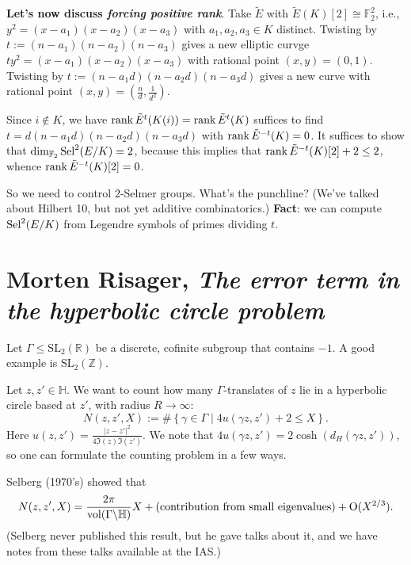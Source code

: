 \documentclass[reqno]{amsart} 
\begin{document}
\textbf{Let's now discuss \emph{forcing positive rank}}.  Take $\tilde{E}$ with $\tilde{E}(K)[2] \cong \mathbb{F}_2^2$, i.e., $y^2 =(x - a_1)(x - a_2)(x - a_3)$ with $a_1, a_2, a_3 \in K$ distinct.  Twisting by $t :=(n - a_1)(n - a_2)(n - a_3)$ gives a new elliptic curvge $t y^2 =(x - a_1)(x - a_2)(x - a_3)$ with rational point $(x, y) =(0, 1)$.  Twisting by $t :=(n - a_1 d)(n - a_2 d)(n - a_3 d)$ gives a new curve with rational point $(x, y) =(\tfrac{n}{d}, \tfrac{1}{d^2})$.

Since $i \notin K$, we have $\operatorname{rank} \tilde{E}^t(K(i)) = \operatorname{rank} \tilde{E}^t(K)$ suffices to find $t = d(n - a_1 d)(n - a_2 d)(n - a_3 d)$ with $\operatorname{rank} \tilde{E}^{- t}(K) = 0$.  It suffices to show that $\dim_{\mathbb{F}_2} \operatorname{Sel}^2(E/K) = 2$, because this implies that $\operatorname{rank} \tilde{E}^{- t}(K)[2] + 2 \leq 2$, whence $\operatorname{rank} \tilde{E}^{- t}(K)[2] = 0$.

So we need to control $2$-Selmer groups.  What's the punchline?  (We've talked about Hilbert 10, but not yet additive combinatorics.)  \textbf{Fact}: we can compute $\operatorname{Sel}^2(E / K)$ from Legendre symbols of primes dividing $t$.

\section{Morten Risager, \emph{The error term in the hyperbolic circle problem}}

Let $\Gamma \leq \mathrm{SL}_2(\mathbb{R})$ be a discrete, cofinite subgroup that contains $- 1$.  A good example is $\mathrm{SL}_2(\mathbb{Z})$.

Let $z, z ' \in \mathbb{H}$.  We want to count how many $\Gamma$-translates of $z$ lie in a hyperbolic circle based at $z'$, with radius $R \rightarrow \infty$:
\begin{equation*}
  N(z, z', X)
  :=
  \#
  \left\{
    \gamma \in \Gamma \mid
    4 u(\gamma z, z ') + 2 \leq X
  \right\}.
\end{equation*}
Here $u(z, z') = \frac{\lvert z - z ' \rvert^2}{4 \Im(z) \Im(z')}$.
We note that  $4 u(\gamma z, z ') = 2 \cosh(d_H(\gamma z, z '))$, so one can formulate the counting problem in a few ways.

Selberg (1970's) showed that
\begin{equation*}
  N(z, z', X)
  =
  \frac{2 \pi}{\operatorname{vol}(\Gamma \backslash \mathbb{H})}
  X
  +
  (\text{contribution from small eigenvalues})
  + \operatorname{O}(X^{2/3}).
\end{equation*}
(Selberg never published this result, but he gave talks about it, and we have notes from these talks available at the IAS.)
\end{document}
